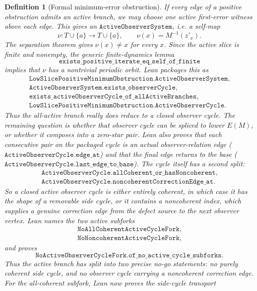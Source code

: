 \documentclass[11pt]{article}
\newtheorem{definition}{Definition}
\begin{document}
\begin{definition}[Formal minimum-error obstruction]
If every edge of a positive obstruction admits an active branch, we may choose
one active first-error witness above each edge.  This gives an
\(\texttt{ActiveObserverSystem}\), i.e. a self-map
\[
  \nu:T\cup\{a\}\to T\cup\{a\},\qquad
  \nu(x)=M^{-1}(z'_x).
\]
The separation theorem gives \(\nu(x)\neq x\) for every \(x\).  Since the active
slice is finite and nonempty, the generic finite-dynamics lemma
\[
  \texttt{exists\_positive\_iterate\_eq\_self\_of\_finite}
\]
implies that \(\nu\) has a nontrivial periodic orbit.  Lean packages this as
\[
\begin{array}{l}
\texttt{LowSlicePositiveMinimumObstruction.ActiveObserverSystem},\\
\texttt{ActiveObserverSystem.exists\_observerCycle},\\
\texttt{exists\_activeObserverCycle\_of\_allActiveBranches},\\
\texttt{LowSlicePositiveMinimumObstruction.ActiveObserverCycle}.
\end{array}
\]
Thus the all-active branch really does reduce to a closed observer cycle.  The
remaining question is whether that observer cycle can be spliced to lower
\(E(M)\), or whether it composes into a zero-star pair.  Lean also proves that
each consecutive pair on the packaged cycle is an actual observer-relation edge
(\(\texttt{ActiveObserverCycle.edge\_at}\)) and that the final edge returns to
the base (\(\texttt{ActiveObserverCycle.last\_edge\_to\_base}\)).
The cycle itself has a second split:
\[
\begin{array}{l}
\texttt{ActiveObserverCycle.allCoherent\_or\_hasNoncoherent},\\
\texttt{ActiveObserverCycle.noncoherentCorrectionEdge\_at}.
\end{array}
\]
So a closed active observer cycle is either entirely coherent, in which case it
has the shape of a removable side cycle, or it contains a noncoherent index,
which supplies a genuine correction edge from the defect source to the next
observer vertex.
Lean names the two active subforks
\[
\begin{array}{l}
\texttt{NoAllCoherentActiveCycleFork},\\
\texttt{NoNoncoherentActiveCycleFork},
\end{array}
\]
and proves
\[
  \texttt{NoActiveObserverCycleFork.of\_no\_active\_cycle\_subforks}.
\]
Thus the active branch has split into two precise no-go statements: no purely
coherent side cycle, and no observer cycle carrying a noncoherent correction
edge.
For the all-coherent subfork, Lean now proves the side-cycle transport

\end{definition}
\end{document}
